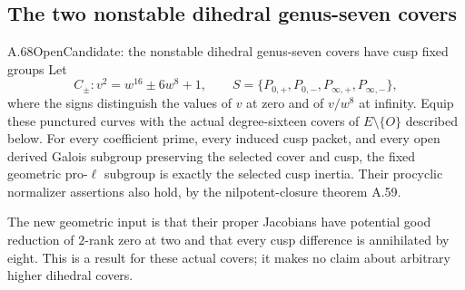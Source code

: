 \subsection{The two nonstable dihedral genus-seven covers}

\begin{statement}{A.68}{Open}{Candidate: the nonstable dihedral genus-seven covers have cusp fixed groups}
Let
\[
 C_{\pm}:v^2=w^{16}\pm6w^8+1,
 \qquad S=\{P_{0,+},P_{0,-},P_{\infty,+},P_{\infty,-}\},
\]
where the signs distinguish the values of \(v\) at zero and of
\(v/w^8\) at infinity. Equip these punctured curves with the actual
degree-sixteen covers of \(E\setminus\{O\}\) described below.
For every coefficient prime, every induced cusp packet, and every
open derived Galois subgroup preserving the selected cover and cusp,
the fixed geometric pro-\(\ell\) subgroup is exactly the selected
cusp inertia. Their procyclic normalizer assertions also hold, by
the nilpotent-closure theorem A.59.

The new geometric input is that their proper Jacobians have potential
good reduction of \(2\)-rank zero at two and that every cusp difference
is annihilated by eight. This is a result for these actual covers;
it makes no claim about arbitrary higher dihedral covers.
\end{statement}

